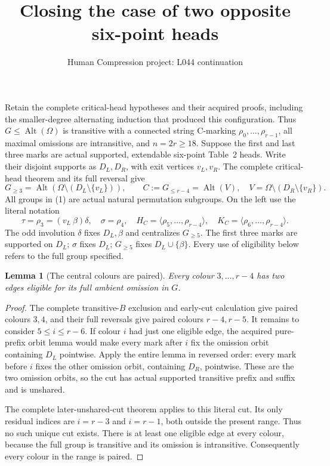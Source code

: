 \documentclass[11pt,a4paper]{article}
\title{Closing the case of two opposite six-point heads}
\author{Human Compression project: L044 continuation}
\date{}
\newtheorem{lemma}{Lemma}
\newcommand{\gen}[1]{\langle#1\rangle}
\newcommand{\Alt}{\operatorname{Alt}}
\begin{document}
\maketitle
Retain the complete critical-head hypotheses and their acquired
proofs, including the smaller-degree alternating induction that
produced this configuration. Thus $G\le\Alt(\Omega)$ is transitive
with a connected string C-marking $\rho_0,\ldots,\rho_{r-1}$,
all maximal omissions are intransitive, and $n=2r\ge18$.
Suppose the first and last three marks are actual supported,
extendable six-point Table~2 heads. Write their disjoint supports
as $D_L,D_R$, with exit vertices $v_L,v_R$. The complete
critical-head theorem and its full reversal give
\[
 G_{\ge3}=\Alt(\Omega\setminus(D_L\setminus\{v_L\})),\qquad
 C:=G_{\le r-4}=\Alt(V),\quad
 V=\Omega\setminus(D_R\setminus\{v_R\}).                 \tag{1}
\]
All groups in (1) are actual natural permutation subgroups.
On the left use the literal notation
\[
 \tau=\rho_3=(v_L\ \beta)\delta,\quad \sigma=\rho_4,
 \quad H_C=\gen{\rho_5,\ldots,\rho_{r-4}},\quad
 K_C=\gen{\rho_6,\ldots,\rho_{r-4}}.
\]
The odd involution $\delta$ fixes $D_L,\beta$ and centralizes
$G_{\ge5}$. The first three marks are supported on $D_L$;
$\sigma$ fixes $D_L$; $G_{\ge5}$ fixes $D_L\cup\{\beta\}$.
Every use of eligibility below refers to the full group specified.

\begin{lemma}[The central colours are paired]
Every colour $3,\ldots,r-4$ has two edges eligible for its
full ambient omission in $G$.
\end{lemma}
\begin{proof}
The complete transitive-$B$ exclusion and early-cut calculation
give paired colours $3,4$, and their full reversals give paired
colours $r-4,r-5$. It remains to consider $5\le i\le r-6$.
If colour $i$ had just one eligible edge, the acquired
pure-prefix orbit lemma would make every mark after $i$ fix
the omission orbit containing $D_L$ pointwise. Apply the entire
lemma in reversed order: every mark before $i$ fixes the other
omission orbit, containing $D_R$, pointwise. These are the two
omission orbits, so the cut has actual supported transitive
prefix and suffix and is unshared.

The complete later-unshared-cut theorem applies to this literal
cut. Its only residual indices are $i=r-3$ and $i=r-1$,
both outside the present range. Thus no such unique cut exists.
There is at least one eligible edge at every colour, because
the full group is transitive and its omission is intransitive.
Consequently every colour in the range is paired.
\end{proof}
\end{document}
